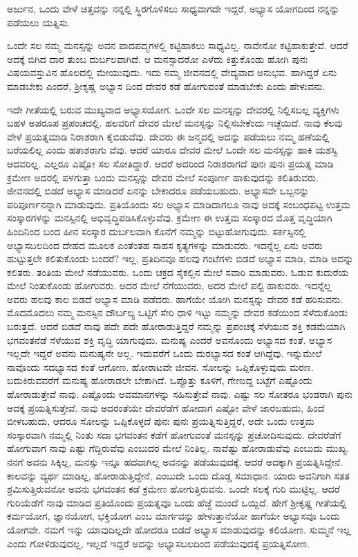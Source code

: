 {\small ಅರ್ಜುನ, ಒಂದು ವೇಳೆ ಚಿತ್ತವನ್ನು ನನ್ನಲ್ಲಿ ಸ್ಥಿರಗೊಳಿಸಲು ಸಾಧ್ಯವಾಗದೇ ಇದ್ದರೆ, ಅಭ್ಯಾಸ ಯೋಗದಿಂದ ನನ್ನನ್ನು ಪಡೆಯಲು ಯತ್ನಿಸು.}

ಒಂದೇ ಸಲ ನಮ್ಮ ಮನಸ್ಸನ್ನು ಅವನ ಪಾದಪದ್ಮಗಳಲ್ಲಿ ಕಟ್ಟಿಹಾಕಲು ಸಾಧ್ಯವಿಲ್ಲ. ನಾವೇನೋ ಕಟ್ಟಿಹಾಕುತ್ತೇವೆ. ಆದರೆ ಅದಕ್ಕೆ ಬಿಗಿದ ದಾರ ತುಂಬ ದುರ್ಬಲವಾಗಿದೆ. ಆ ಮನಸ್ಸಾದರೋ ಎಳೆದು ಕಿತ್ತುಕೊಂಡು ಹೋಗಿ ಪುನಃ ವಿಷಯವಸ್ತುವಿನ ಹೊಲದಲ್ಲಿ ಮೇಯುವುದು. ಇದು ನಮ್ಮ ಜೀವನದಲ್ಲಿ ವೇದ್ಯವಾದ ಅನುಭವ. ಹಾಗಿದ್ದರೆ ಏನು ಮಾಡಬೇಕು ಎಂದರೆ, ಶ‍್ರೀಕೃಷ್ಣ ಅಭ್ಯಾಸ ದಿಂದ ದೇವರ ಕಡೆ ಹೋಗುವಂತೆ ಮಾಡಬೇಕು ಎಂದು ಹೇಳುವನು.

ಇದೇ ಗೀತೆಯಲ್ಲಿ ಬರುವ ಮುಖ್ಯವಾದ ಅಭ್ಯಾಸಯೋಗ. ಒಂದೇ ಸಲ ಮನಸ್ಸನ್ನು ದೇವರಲ್ಲಿ ನಿಲ್ಲಿಸಬಲ್ಲ ವ್ಯಕ್ತಿಗಳು ಬಹಳ ಅಪರೂಪ ಪ್ರಪಂಚದಲ್ಲಿ. ಹಲವರಿಗೆ ದೇವರ ಮೇಲೆ ಮನಸ್ಸನ್ನು ನಿಲ್ಲಿಸಬೇಕೆಂದು ಇಚ್ಛೆಯಿದೆ. ನಾವು ಕೆಲವು ವೇಳೆ ಪ್ರಯತ್ನಮಾಡಿ ನಿರಾಶರಾಗಿ ಕೈಬಿಡುವೆವು. ದೇವರು ಈ ಜನ್ಮದಲ್ಲಿ ಅದನ್ನು ಪಡೆಯಲು ನಮ್ಮ ಹಣೆಯಲ್ಲಿ ಬರೆಯಲಿಲ್ಲ ಎಂದು ಹತಾಶರಾಗು ವೆವು. ಆದರೆ ಯಾರೂ ದೇವರ ಮೇಲೆ ಒಂದೇ ಸಲ ಮನಸ್ಸನ್ನು ಹಾಕಿ ಯಶಸ್ವಿ ಆದವರಿಲ್ಲ. ಎಲ್ಲರೂ ಎಷ್ಟೋ ಸಲ ಸೋತಿದ್ದಾರೆ. ಆದರೆ ಅದರಿಂದ ನಿರಾಶರಾಗದೆ ಪುನಃ ಪುನಃ ಪ್ರಯತ್ನ ಮಾಡಿ ಕ್ರಮೇಣ ಅದರಲ್ಲಿ ಪಳಗುತ್ತಾ ಬಂದು ಮನಸ್ಸನ್ನು ದೇವರ ಮೇಲೆ ಸಂಪೂರ್ಣ ಹಾಕುವುದನ್ನು ಕಲಿತಿರುವರು. ಜೀವನದಲ್ಲಿ ಬಿಡದೆ ಅಭ್ಯಾಸ ಮಾಡಿದರೆ ಏನನ್ನು ಬೇಕಾದರೂ ಪಡೆಯಬಹುದು. ಅಭ್ಯಾಸವೇ ಒಬ್ಬನನ್ನು ಪರಿಪೂರ್ಣನನ್ನಾಗಿ ಮಾಡುವುದು. ಪ್ರತಿಯೊಂದು ಸಲ ಅಭ್ಯಾಸ ಮಾಡಿದಾಗಲೂ ನಾವು ಅದಕ್ಕೆ ಸಂಬಂಧಪಟ್ಟ ಉತ್ತಮ ಸಂಸ್ಕಾರಗಳನ್ನು ಮನಸ್ಸಿನಲ್ಲಿ ಅಭಿವೃದ್ಧಿಪಡಿಸಿಕೊಳ್ಳುವೆವು. ಕ್ರಮೇಣ ಈ ಉತ್ತಮ ಸಂಸ್ಕಾರದ ಮೊತ್ತ ವೃದ್ಧಿಯಾಗಿ ಹಿಂದಿನಿಂದ ಬಂದ ಹೀನ ಸಂಸ್ಕಾರ ದುರ್ಬಲವಾಗಿ ಕೊನೆಗೆ ನಮ್ಮನ್ನು ಬಿಟ್ಟುಹೋಗುವುದು. ಸರ್ಕಸ್ಸಿನಲ್ಲಿ ಅಭ್ಯಾಸಬಲದಿಂದ ದೇಹದ ಮೂಲಕ ಎಂತೆಂತಹ ಸಾಹಸ ಕೃತ್ಯಗಳನ್ನು ಮಾಡುವರು. ಇದನ್ನೆಲ್ಲ ಏನು ಅವರು ಹುಟ್ಟುತ್ತಲೇ ಕಲಿತುಕೊಂಡು ಬಂದರೆ? ಇಲ್ಲ, ಪ್ರತಿದಿನವೂ ಹಲವು ಗಂಟೆಗಳು ಬಿಡದೆ ಅಭ್ಯಾಸ ಮಾಡಿ, ಮಾಡಿ ಅದನ್ನು ಕಲಿತರು. ತಂತಿಯ ಮೇಲೆ ನಡೆಯುವರು. ಒಂದು ಚಕ್ರದ ಸೈಕಲ್ಲಿನ ಮೇಲೆ ಸವಾರಿ ಮಾಡುವರು. ಓಡುವ ಕುದುರೆಯ ಮೇಲೆ ನಿಂತುಕೊಂಡು ಹೋಗುವರು. ಅದರ ಮೇಲೆ ನೆಗೆಯುವರು, ಅದರ ಮೇಲೆ ಪಲ್ಟಿ ಹಾಕುವರು. ಇದನ್ನೆಲ್ಲ ಅವರು ಹಲವು ಕಾಲ ಬಿಡದೆ ಅಭ್ಯಾಸ ಮಾಡಿ ಪಡೆದರು. ಹಾಗೆಯೇ ಯೋಗಿ ಮನಸ್ಸನ್ನು ದೇವರ ಕಡೆ ಹರಿಸುವನು. ಮೊದಮೊದಲು ನಮ್ಮ ಮನಸ್ಸಿನ ದೌರ್ಬಲ್ಯ ಒಟ್ಟಿಗೆ ಸೇರಿ ಧಾಳಿ ಇಟ್ಟು ನಮ್ಮನ್ನು ದೇವರ ಕಡೆಯಿಂದ ಸೆಳೆದುಕೊಂಡು ಬರುತ್ತದೆ. ಆದರೆ ಬಿಡದೆ ನಾವು ಪದೇ ಪದೇ ಹೋರಾಡುತ್ತಿದ್ದರೆ ನಮ್ಮನ್ನು ಪ್ರಪಂಚಕ್ಕೆ ಸೆಳೆಯುವ ಶಕ್ತಿ ಕಡಮೆಯಾಗಿ ಭಗವಂತನೆಡೆ ಸೆಳೆಯುವ ಶಕ್ತಿ ವೃದ್ಧಿ ಯಾಗುವುದು. ಮನುಷ್ಯ ಎಂದರೆ ಅವನೊಂದು ಅಭ್ಯಾಸದ ಕಂತೆ. ಅಭ್ಯಾಸ ಇಲ್ಲದೇ ಇದ್ದರೆ ಅವನು ಮನುಷ್ಯನೇ ಅಲ್ಲ. ಇದುವರೆಗೆ ಒಂದು ದುರಭ್ಯಾಸದ ಕಂತೆ ಆಗಿದ್ದೆವು. ಇನ್ನುಮೇಲೆ ನಾವೊಂದು ಸದಭ್ಯಾಸದ ಕಂತೆ ಆಗೋಣ. ಹೋರಾಟವೇ ಜೀವನ. ಸೋಲನ್ನು ಒಪ್ಪಿಕೊಳ್ಳುವುದು ಮರಣ. ಬದುಕಿರುವವರೆಗೆ ಮನುಷ್ಯ ಹೋರಾಡಲೇ ಬೇಕಾಗಿದೆ. ಒಪ್ಪೊತ್ತು ಕೂಳಿಗೆ, ಗೇಣುದ್ದ ಬಟ್ಟೆಗೆ ಎಷ್ಟೊಂದು ಹೋರಾಡುತ್ತೇವೆ ನಾವು. ಎಷ್ಟೊಂದು ಅವಮಾನಗಳನ್ನು ಸಹಿಸುತ್ತೇವೆ ನಾವು. ಎಷ್ಟು ಸಲ ಸೋತರೂ ಭಂಡರಾಗಿ ಪುನಃ ಅದಕ್ಕೆ ಪ್ರಯತ್ನಿಸುತ್ತೇವೆ. ನಾವು ಅದರಂತೆಯೇ ದೇವರೆಡೆಗೆ ಹೋದಾಗ ಎಷ್ಟೋ ವೇಳೆ ಜಾರಬಹುದು, ಹಿಂದೆ ಬೀಳಬಹುದು, ಆದರೂ ಸೋಲನ್ನು ಒಪ್ಪಿಕೊಳ್ಳದೆ ಪುನಃ ಪುನಃ ಪ್ರಯತ್ನಿಸುತ್ತಿದ್ದರೆ, ಅದೇ ಒಂದು ಉತ್ತಮ ಸಂಸ್ಕಾರವಾಗಿ ನಮ್ಮಲ್ಲಿ ನಿಂತು ಸದಾ ಭಗವಂತನ ಕಡೆಗೆ ಹೋಗುವಂತೆ ಮನಸ್ಸನ್ನು ಪ್ರಚೋದಿಸುವುದು. ದೇವರೆಡೆಗೆ ಹೋಗುವಾಗ ನಾವು ಎಷ್ಟು ಗೆದ್ದಿರುವೆವು ಎಂಬುದರ ಮೇಲೆ ನಿಂತಿಲ್ಲ. ನಾವೆಷ್ಟು ಹೋರಾಡುವೆವು ಎಂಬುದು ಮುಖ್ಯ. ನನಗೆ ಅವನು ಸಿಕ್ಕಿಲ್ಲ, ಮನಸ್ಸು ಇನ್ನೂ ಹದವಾಗಿಲ್ಲ ಅವನನ್ನು ಪಡೆಯುವುದಕ್ಕೆ. ಆದರೆ ಅದಕ್ಕಾಗಿ ಪ್ರಯತ್ನಿಸಿದ್ದೇನೆ. ಕಾಲವನ್ನು ವ್ಯರ್ಥ ಮಾಡಿಲ್ಲ, ಹೋರಾಡುತ್ತಿದ್ದೇನೆ, ಎಂಬುದೇ ಒಂದು ದೊಡ್ಡ ಸಮಾಧಾನ. ಯಾರು ಅವನಿಗಾಗಿ ಸತತ ಶ್ರಮಿಸುತ್ತಿರುವನೋ ಅವನು ಭಗವಂತನ ಕಡೆ ಕ್ರಮೇಣ ಹೋಗುತ್ತಿರುವನು. ಒಂದೇ ಸಲಕ್ಕೆ ಗುರಿ ಮುಟ್ಟಿಲ್ಲ. ಆದರೆ ಗುರಿಯೆಡೆಗೆ ನಾವು ಮಾಡಿದ ಪ್ರತಿಯೊಂದು ಪ್ರಯತ್ನವೂ ಒಂದು ಹೆಜ್ಜೆ ಮುಂದೆ ಒಯ್ದಿದೆ. ಹೇಗೆ ಶ‍್ರೀಕೃಷ್ಣ ಗೀತೆಯಲ್ಲಿ ಕರ್ಮಯೋಗ, ಜ್ಞಾನಯೋಗ, ಭಕ್ತಿಯೋಗ ಎಂಬ ಮಾರ್ಗವನ್ನು ಹೇಳುತ್ತಾನೆಯೋ ಹಾಗೆಯೇ ಅಭ್ಯಾಸವೂ ಒಂದು ಯೋಗವೇ. ನಮಗೆ ಇನ್ನು ಯಾವುದಿಲ್ಲದೇ ಹೋದರೂ ಬಿಡದೆ ಅಭ್ಯಾಸ ಮಾಡುವುದನ್ನು ಕಲಿಯೋಣ. ಸುಮ್ಮನೆ ಇಲ್ಲ ಎಂದು ಗೋಳಿಡುವುದಲ್ಲ, ಇಲ್ಲದೆ ಇದ್ದರೆ ಅದನ್ನು ಅಭ್ಯಾಸಬಲದಿಂದ ಪಡೆಯುವುದಕ್ಕೆ ಪ್ರಯತ್ನಿಸೋಣ.


